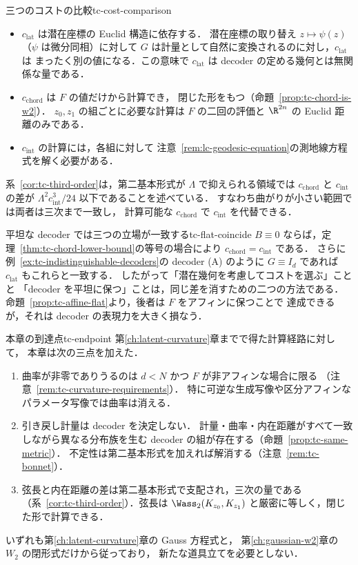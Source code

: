 \begin{remark}{三つのコストの比較}{tc-cost-comparison}
  \begin{itemize}
    \item $c_{\mathrm{lat}}$ は潜在座標の Euclid 構造に依存する．
      潜在座標の取り替え $z\mapsto\psi(z)$（$\psi$ は微分同相）に対して
      $G$ は計量として自然に変換されるのに対し，$c_{\mathrm{lat}}$ は
      まったく別の値になる．この意味で $c_{\mathrm{lat}}$ は
      decoder の定める幾何とは無関係な量である．
    \item $c_{\mathrm{chord}}$ は $F$ の値だけから計算でき，
      閉じた形をもつ（命題~\ref{prop:tc-chord-is-w2}）．
      $z_0,z_1$ の組ごとに必要な計算は $F$ の二回の評価と
      $\R^{2n}$ の Euclid 距離のみである．
    \item $c_{\mathrm{int}}$ の計算には，各組に対して
      注意~\ref{rem:lc-geodesic-equation}の測地線方程式を解く必要がある．
  \end{itemize}
  系~\ref{cor:tc-third-order}は，第二基本形式が $\Lambda$ で抑えられる領域では
  $c_{\mathrm{chord}}$ と $c_{\mathrm{int}}$ の差が
  $\Lambda^2c_{\mathrm{int}}^3/24$ 以下であることを述べている．
  すなわち曲がりが小さい範囲では両者は三次まで一致し，
  計算可能な $c_{\mathrm{chord}}$ で $c_{\mathrm{int}}$ を代替できる．
\end{remark}

\begin{remark}{平坦な decoder では三つの立場が一致する}{tc-flat-coincide}
  $B\equiv0$ ならば，定理~\ref{thm:tc-chord-lower-bound}の等号の場合により
  $c_{\mathrm{chord}}=c_{\mathrm{int}}$ である．
  さらに例~\ref{ex:tc-indistinguishable-decoders}の decoder (A) のように
  $G\equiv I_d$ であれば $c_{\mathrm{lat}}$ もこれらと一致する．
  したがって「潜在幾何を考慮してコストを選ぶ」ことと
  「decoder を平坦に保つ」ことは，同じ差を消すための二つの方法である．
  命題~\ref{prop:tc-affine-flat}より，後者は $F$ をアフィンに保つことで
  達成できるが，それは decoder の表現力を大きく損なう．
\end{remark}

\begin{remark}{本章の到達点}{tc-endpoint}
  第\ref{ch:latent-curvature}章までで得た計算経路に対して，
  本章は次の三点を加えた．
  \begin{enumerate}
    \item 曲率が非零でありうるのは $d<N$ かつ $F$ が非アフィンな場合に限る
      （注意~\ref{rem:tc-curvature-requirements}）．
      特に可逆な生成写像や区分アフィンなパラメータ写像では曲率は消える．
    \item 引き戻し計量は decoder を決定しない．
      計量・曲率・内在距離がすべて一致しながら異なる分布族を生む
      decoder の組が存在する（命題~\ref{prop:tc-same-metric}）．
      不定性は第二基本形式を加えれば解消する（注意~\ref{rem:tc-bonnet}）．
    \item 弦長と内在距離の差は第二基本形式で支配され，三次の量である
      （系~\ref{cor:tc-third-order}）．弦長は
      $\Wass_2(K_{z_0},K_{z_1})$ と厳密に等しく，閉じた形で計算できる．
  \end{enumerate}
  いずれも第\ref{ch:latent-curvature}章の Gauss 方程式と，
  第\ref{ch:gaussian-w2}章の $W_2$ の閉形式だけから従っており，
  新たな道具立てを必要としない．
\end{remark}
